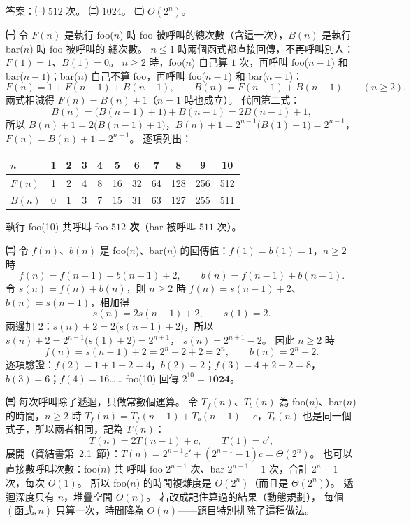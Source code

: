 \begin{pastsoln}
答案：㈠ $512$ 次。 ㈡ $1024$。 ㈢ $O(2^n)$。

\textbf{㈠} 令 $F(n)$ 是執行 foo($n$) 時 foo 被呼叫的總次數（含這一次），$B(n)$ 是執行 bar($n$) 時 foo 被呼叫的
總次數。 $n \le 1$ 時兩個函式都直接回傳，不再呼叫別人：$F(1) = 1$、$B(1) = 0$。 $n \ge 2$ 時，foo($n$) 自己算
$1$ 次，再呼叫 foo($n-1$) 和 bar($n-1$)；bar($n$) 自己不算 foo，再呼叫 foo($n-1$) 和 bar($n-1$)：
\[
F(n) = 1 + F(n-1) + B(n-1), \qquad B(n) = F(n-1) + B(n-1) \qquad (n \ge 2).
\]
兩式相減得 $F(n) = B(n) + 1$（$n = 1$ 時也成立）。 代回第二式：
\[
B(n) = \bigl(B(n-1) + 1\bigr) + B(n-1) = 2B(n-1) + 1,
\]
所以 $B(n) + 1 = 2\bigl(B(n-1) + 1\bigr)$，$B(n) + 1 = 2^{n-1}\bigl(B(1) + 1\bigr) = 2^{n-1}$，
$F(n) = B(n) + 1 = 2^{n-1}$。 逐項列出：
\begin{center}
\small
\begin{tabular}{l*{10}{c}}
\toprule
$n$ & 1 & 2 & 3 & 4 & 5 & 6 & 7 & 8 & 9 & 10 \\
\midrule
$F(n)$ & 1 & 2 & 4 & 8 & 16 & 32 & 64 & 128 & 256 & 512 \\
$B(n)$ & 0 & 1 & 3 & 7 & 15 & 31 & 63 & 127 & 255 & 511 \\
\bottomrule
\end{tabular}
\end{center}
執行 foo(10) 共呼叫 foo \textbf{$512$ 次}（bar 被呼叫 $511$ 次）。

\textbf{㈡} 令 $f(n)$、$b(n)$ 是 foo($n$)、bar($n$) 的回傳值：$f(1) = b(1) = 1$，$n \ge 2$ 時
\[
f(n) = f(n-1) + b(n-1) + 2, \qquad b(n) = f(n-1) + b(n-1).
\]
令 $s(n) = f(n) + b(n)$，則 $n \ge 2$ 時 $f(n) = s(n-1) + 2$、$b(n) = s(n-1)$，相加得
\[
s(n) = 2s(n-1) + 2, \qquad s(1) = 2 .
\]
兩邊加 $2$：$s(n) + 2 = 2\bigl(s(n-1) + 2\bigr)$，所以 $s(n) + 2 = 2^{n-1}\bigl(s(1) + 2\bigr) = 2^{n+1}$，
$s(n) = 2^{n+1} - 2$。 因此 $n \ge 2$ 時
\[
f(n) = s(n-1) + 2 = 2^{n} - 2 + 2 = 2^n, \qquad b(n) = 2^n - 2 .
\]
逐項驗證：$f(2) = 1 + 1 + 2 = 4$，$b(2) = 2$；$f(3) = 4 + 2 + 2 = 8$，$b(3) = 6$；$f(4) = 16$……
foo(10) 回傳 $2^{10} = \mathbf{1024}$。

\textbf{㈢} 每次呼叫除了遞迴，只做常數個運算。 令 $T_f(n)$、$T_b(n)$ 為 foo($n$)、bar($n$) 的時間，$n \ge 2$ 時
$T_f(n) = T_f(n-1) + T_b(n-1) + c$，$T_b(n)$ 也是同一個式子，所以兩者相同，記為 $T(n)$：
\[
T(n) = 2T(n-1) + c, \qquad T(1) = c',
\]
展開（資結書第~2.1~節）：$T(n) = 2^{n-1}c' + (2^{n-1} - 1)c = \Theta(2^n)$。 也可以直接數呼叫次數：foo($n$) 共
呼叫 foo $2^{n-1}$ 次、bar $2^{n-1} - 1$ 次，合計 $2^n - 1$ 次，每次 $O(1)$。 所以 foo($n$) 的時間複雜度是
$O(2^n)$（而且是 $\Theta(2^n)$）。 遞迴深度只有 $n$，堆疊空間 $O(n)$。 若改成記住算過的結果（動態規劃），
每個 $(\text{函式}, n)$ 只算一次，時間降為 $O(n)$——題目特別排除了這種做法。
\end{pastsoln}
